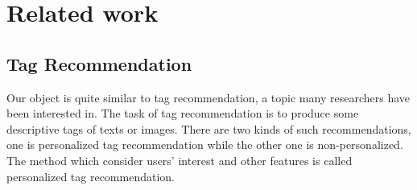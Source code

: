 \section{Related work}
\subsection{Tag Recommendation}
%
%
%
Our object is quite similar to tag recommendation, a topic many researchers have
been interested in. The task of tag recommendation is to produce some descriptive
tags of texts or images.
There are two kinds of such recommendations, one is
personalized tag recommendation while the other one is non-personalized.
The method which consider users' interest and other features is called personalized
tag recommendation.

